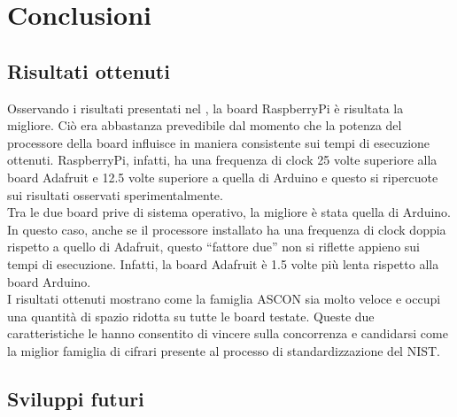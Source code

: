 \chapter{Conclusioni}

\section{Risultati ottenuti}

Osservando i risultati presentati nel , la board RaspberryPi è risultata la migliore. Ciò era abbastanza prevedibile dal momento che la potenza del processore della board influisce in maniera consistente sui tempi di esecuzione ottenuti. RaspberryPi, infatti, ha una frequenza di clock 25 volte superiore alla board Adafruit e 12.5 volte superiore a quella di Arduino e questo si ripercuote sui risultati osservati sperimentalmente. \\

\noindent Tra le due board prive di sistema operativo, la migliore è stata quella di Arduino. In questo caso, anche se il processore installato ha una frequenza di clock doppia rispetto a quello di Adafruit, questo ``fattore due'' non si riflette appieno sui tempi di esecuzione. Infatti, la board Adafruit è 1.5 volte più lenta rispetto alla board Arduino. \\

\noindent I risultati ottenuti mostrano come la famiglia ASCON sia molto veloce e occupi una quantità di spazio ridotta su tutte le board testate. Queste due caratteristiche le hanno consentito di vincere sulla concorrenza e candidarsi come la miglior famiglia di cifrari presente al processo di standardizzazione del NIST.

\section{Sviluppi futuri}

